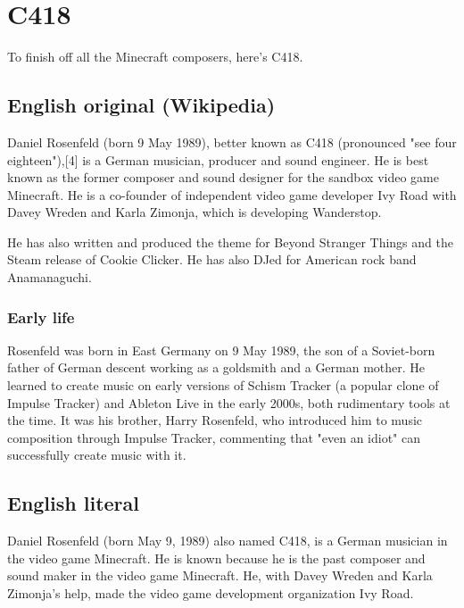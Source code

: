 

\section{C418}
To finish off all the Minecraft composers, here's C418.

\subsection*{English original (Wikipedia)}
Daniel Rosenfeld (born 9 May 1989), better known as C418 (pronounced "see four eighteen"),[4] is a German musician, producer and sound engineer.
He is best known as the former composer and sound designer for the sandbox video game Minecraft.
He is a co-founder of independent video game developer Ivy Road with Davey Wreden and Karla Zimonja, which is developing Wanderstop. 

He has also written and produced the theme for Beyond Stranger Things and the Steam release of Cookie Clicker.
He has also DJed for American rock band Anamanaguchi. 

\subsubsection*{Early life}
Rosenfeld was born in East Germany on 9 May 1989, the son of a Soviet-born father of German descent working as a goldsmith and a German mother.
He learned to create music on early versions of Schism Tracker (a popular clone of Impulse Tracker) and Ableton Live in the early 2000s, both rudimentary tools at the time.
It was his brother, Harry Rosenfeld, who introduced him to music composition through Impulse Tracker, commenting that "even an idiot" can successfully create music with it.

\subsection*{English literal}
Daniel Rosenfeld (born May 9, 1989) also named C418, is a German musician in the video game Minecraft.
He is known because he is the past composer and sound maker in the video game Minecraft.
He, with Davey Wreden and Karla Zimonja's help, made the video game development organization Ivy Road.

